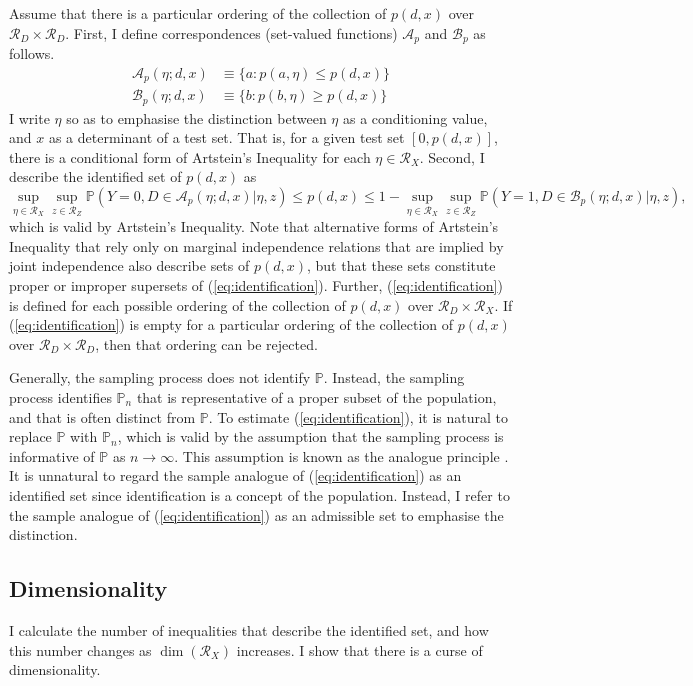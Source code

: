 \documentclass[10pt,a4paper,twoside]{article}
\numberwithin{equation}{section}
\newcommand{\Art}{Artstein's Inequality}
\begin{document}
Assume that there is a particular ordering of the collection of $p(d,x)$ over $\mathcal{R}_D\times\mathcal{R}_D$. First, I define correspondences (set-valued functions) $\mathcal{A}_p$ and $\mathcal{B}_p$ as follows.
\begin{align*}
\mathcal{A}_p(\eta;d,x)&\equiv\lbrace a : p(a,\eta)\leq p(d,x)\rbrace\\
\mathcal{B}_p(\eta;d,x)&\equiv\lbrace b : p(b,\eta)\geq p(d,x)\rbrace
\end{align*}
I write $\eta$ so as to emphasise the distinction between $\eta$ as a conditioning value, and $x$ as a determinant of a test set. That is, for a given test set $[0,p(d,x)]$, there is a conditional form of {\Art} for each $\eta\in\mathcal{R}_X$. Second, I describe the identified set of $p(d,x)$ as
\begin{equation}
\sup_{\eta\in\mathcal{R}_X}\sup_{z\in\mathcal{R}_Z}\mathbb{P}(Y=0,D\in\mathcal{A}_p(\eta;d,x)|\eta,z)\leq p(d,x)\leq 1-\sup_{\eta\in\mathcal{R}_X}\sup_{z\in\mathcal{R}_Z}\mathbb{P}(Y=1,D\in\mathcal{B}_p(\eta;d,x)|\eta,z),\label{eq:identification}
\end{equation}
which is valid by {\Art}. Note that alternative forms of {\Art} that rely only on marginal independence relations that are implied by joint independence also describe sets of $p(d,x)$, but that these sets constitute proper or improper supersets of (\ref{eq:identification}). Further, (\ref{eq:identification}) is defined for each possible ordering of the collection of $p(d,x)$ over $\mathcal{R}_D\times\mathcal{R}_X$. If (\ref{eq:identification}) is empty for a particular ordering of the collection of $p(d,x)$ over $\mathcal{R}_D\times\mathcal{R}_D$, then that ordering can be rejected. 

Generally, the sampling process does not identify $\mathbb{P}$. Instead, the sampling process identifies $\mathbb{P}_n$ that is representative of a proper subset of the population, and that is often distinct from $\mathbb{P}$. To estimate (\ref{eq:identification}), it is natural to replace $\mathbb{P}$ with $\mathbb{P}_n$, which is valid by the assumption that the sampling process is informative of $\mathbb{P}$ as $n\rightarrow\infty$. This assumption is known as the analogue principle \citep{book.analogue}. It is unnatural to regard the sample analogue of (\ref{eq:identification}) as an identified set since identification is a concept of the population. Instead, I refer to the sample analogue of (\ref{eq:identification}) as an admissible set to emphasise the distinction.   
\subsection{Dimensionality}
I calculate the number of inequalities that describe the identified set, and how this number changes as $\dim(\mathcal{R}_X)$ increases. I show that there is a curse of dimensionality.
\end{document}
